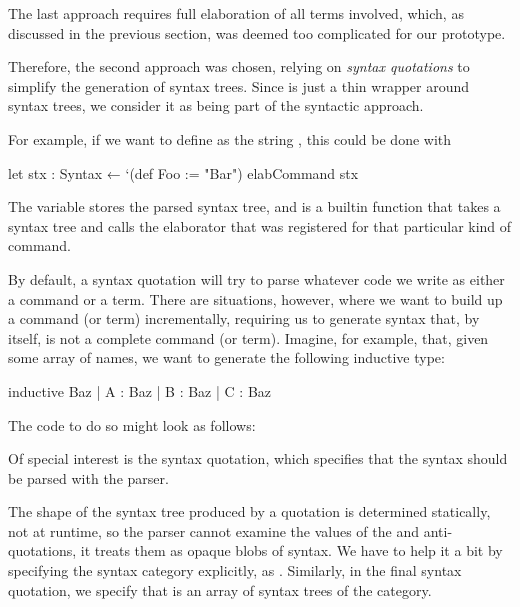 The last approach requires full elaboration of all terms involved, which, as discussed in the previous section, was deemed too complicated for our prototype.

Therefore, the second approach was chosen, relying on \emph{syntax quotations} to simplify the generation of syntax trees.
Since  is just a thin wrapper around syntax trees, we consider it as being part of the syntactic approach.

For example, if we want to define  as the string , this could be done with
\begin{leancode}
    let stx : Syntax ← `(def Foo := "Bar")
    elabCommand stx
\end{leancode}
The variable  stores the parsed syntax tree, and  is a builtin function  that takes a  syntax tree and calls the elaborator that was registered for that particular kind of command.

By default, a syntax quotation will try to parse whatever code we write as either a command or a term. There are situations, however, where we want to build up a command (or term) incrementally, requiring us to generate syntax that, by itself, is not a complete command (or term). Imagine, for example, that, given some array \lean{[`A, `B, `C]} of names, we want to generate the following inductive type:
\begin{leancode}
    inductive Baz
      | A : Baz
      | B : Baz
      | C : Baz
\end{leancode}
The code to do so might look as follows:
Of special interest is the  syntax quotation, which specifies that the syntax should be parsed with the  parser. 

The shape of the syntax tree produced by a quotation is determined statically, not at runtime, so the parser cannot examine the values of the  and  anti-quotations, it treats them as opaque blobs of syntax. We have to help it a bit by specifying the syntax category explicitly, as .
Similarly, in the final \inductive{} syntax quotation, we specify that  is an array of syntax trees of the  category.

